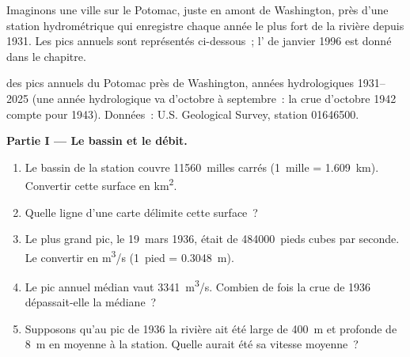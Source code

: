 \begin{problem}
\label{pb:g10:drainage-basins:1}
Imaginons une ville sur le Potomac, juste en amont de Washington, près d'une
station hydrométrique qui enregistre chaque année le plus fort  de la
rivière depuis 1931. Les pics annuels sont représentés ci-dessous~;
l' de janvier 1996 est donné dans le chapitre.

\begin{center}

{\small {} des pics annuels du Potomac près de Washington, années
hydrologiques 1931--2025 (une année hydrologique va d'octobre à
septembre~: la crue d'octobre 1942 compte pour 1943).
Données~: U.S. Geological Survey, station 01646500.}
\end{center}

\medskip
\noindent\textbf{Partie I --- Le bassin et le débit.}
\begin{enumerate}
  \item Le bassin de la station couvre \num{11560}~milles carrés
        (\num{1}~mille = \qty{1.609}{km}). Convertir cette surface en
        \unit{km^2}.
  \item Quelle ligne d'une carte délimite cette surface~?
  \item Le plus grand pic, le 19~mars 1936, était de \num{484000}~pieds
        cubes par seconde. Le convertir en \unit{m^3/s} (\num{1}~pied =
        \qty{0.3048}{m}).
  \item Le pic annuel médian vaut \qty{3341}{m^3/s}. Combien de fois la
        crue de 1936 dépassait-elle la médiane~?
  \item Supposons qu'au pic de 1936 la rivière ait été large de
        \qty{400}{m} et profonde de \qty{8}{m} en moyenne à la station.
        Quelle aurait été sa vitesse moyenne~?
\end{enumerate}


\end{problem}
